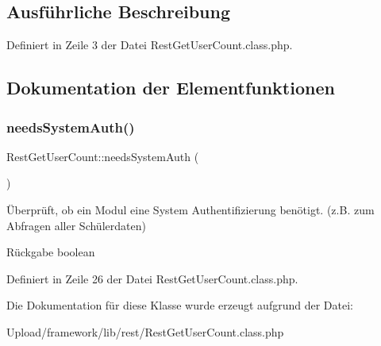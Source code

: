 \subsection{Ausführliche Beschreibung}


Definiert in Zeile 3 der Datei Rest\+Get\+User\+Count.\+class.\+php.



\subsection{Dokumentation der Elementfunktionen}
\mbox{\label{class_rest_get_user_count_a69097d731d433ad6d12fd9a7a814389d}} 
\subsubsection{\texorpdfstring{needs\+System\+Auth()}{needsSystemAuth()}}
{\footnotesize\ttfamily Rest\+Get\+User\+Count\+::needs\+System\+Auth (\begin{DoxyParamCaption}{ }\end{DoxyParamCaption})}

Überprüft, ob ein Modul eine System Authentifizierung benötigt. (z.\+B. zum Abfragen aller Schülerdaten) \begin{DoxyReturn}{Rückgabe}
boolean 
\end{DoxyReturn}


Definiert in Zeile 26 der Datei Rest\+Get\+User\+Count.\+class.\+php.



Die Dokumentation für diese Klasse wurde erzeugt aufgrund der Datei\+:\begin{DoxyCompactItemize}
\item 
Upload/framework/lib/rest/Rest\+Get\+User\+Count.\+class.\+php\end{DoxyCompactItemize}
